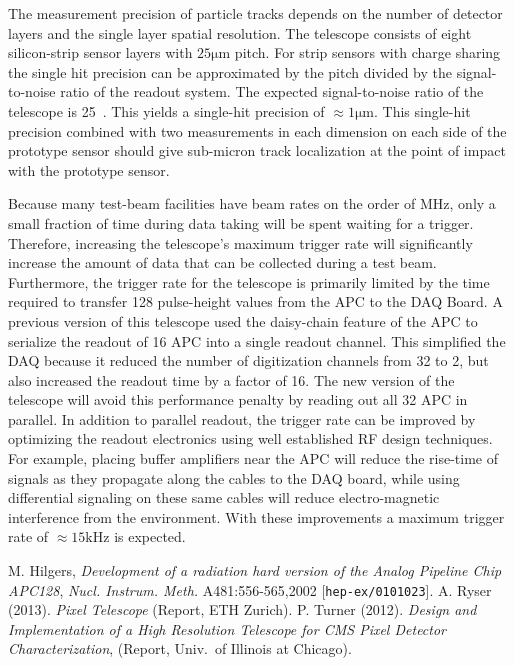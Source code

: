 \documentclass{PoS}
\newcommand{\micron}{\si{\micro\meter}}
\begin{document}
The measurement precision of particle tracks depends on the number of detector
layers and the single layer spatial resolution. The telescope consists of eight
silicon-strip sensor layers with $25\micron$ pitch. For strip sensors
with charge sharing the single hit precision can be approximated by the
pitch divided by the signal-to-noise ratio of the readout system.
The expected signal-to-noise ratio of the telescope is 25~\cite{Ryser2013}. This yields a single-hit precision of
$\approx1\micron$. This single-hit precision combined with two measurements in
each dimension on each side of the prototype sensor should give sub-micron
track localization at the point of impact with the prototype sensor.

Because many test-beam facilities have beam rates on the order of
\si{\mega\hertz}, only a small fraction of time during data taking will be
spent waiting for a trigger. Therefore, increasing the telescope's maximum
trigger rate will significantly increase the amount of data that can be
collected during a test beam.  Furthermore, the trigger rate for the telescope
is primarily limited by the time required to transfer 128 pulse-height values
from the APC to the DAQ Board.  A previous version of this telescope used the
daisy-chain feature of the APC to serialize the readout of 16 APC into a single
readout channel\cite{Turner2012}. This simplified the DAQ because it reduced the number of
digitization channels from 32 to 2, but also increased the readout time by a
factor of 16. The new version of the telescope will avoid this performance
penalty by reading out all 32 APC in parallel. In addition to parallel readout, the
trigger rate can be improved by optimizing the readout electronics using well
established RF design techniques. For example, placing buffer amplifiers near
the APC will reduce the rise-time of signals as they propagate along the cables
to the DAQ board, while using differential signaling on these same cables will
reduce electro-magnetic interference from the environment. With these
improvements a maximum trigger rate of $\approx15\si{\kilo\hertz}$ is expected.


\begin{thebibliography}{99}
M. Hilgers,
\emph{Development of a radiation hard version of the Analog Pipeline Chip APC128},
\emph{Nucl. Instrum. Meth.} A481:556-565,2002
[{\tt hep-ex/0101023}].
A. Ryser (2013). \emph{Pixel Telescope} (Report, ETH Zurich).
P. Turner (2012). \emph{Design and Implementation of a High Resolution Telescope for CMS Pixel Detector Characterization}, (Report, Univ.\ of Illinois at Chicago).
\end{thebibliography}
\end{document}
